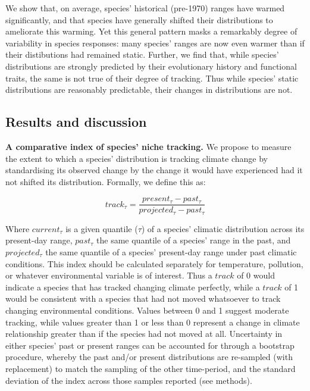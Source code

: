 \documentclass[12pt]{report}
\begin{document}
We show that, on average, species' historical (pre-1970) ranges have
warmed significantly, and that species have generally shifted their
distributions to ameliorate this warming. Yet this general pattern
masks a remarkably degree of variability in species responses: many
species' ranges are now even warmer than if their distibutions had
remained static. Further, we find that, while species' distributions
are strongly predicted by their evolutionary history and functional
traits, the same is not true of their degree of tracking. Thus while
species' static distributions are reasonably predictable, their
changes in distributions are not.

\clearpage
\subsection*{Results and discussion}
\textbf{A comparative index of species' niche tracking.} We propose to
measure the extent to which a species' distribution is tracking
climate change by standardising its observed change by the change it
would have experienced had it not shifted its distribution. Formally,
we define this as:

\begin{equation}
  track_\tau = \frac{present_\tau - past_\tau}{projected_\tau - past_\tau}
\end{equation}

Where $current_\tau$ is a given quantile ($\tau$) of a species'
climatic distribution across its present-day range, $past_\tau$ the
same quantile of a species' range in the past, and $projected_\tau$
the same quantile of a species' present-day range under past climatic
conditions. This index should be calculated separately for
temperature, pollution, or whatever environmental variable is of
interest. Thus a $track$ of 0 would indicate a species that has
tracked changing climate perfectly, while a $track$ of 1 would be
consistent with a species that had not moved whatsoever to track
changing environmental conditions. Values between 0 and 1 suggest
moderate tracking, while values greater than 1 or less than 0
represent a change in climate relationship greater than if the species
had not moved at all. Uncertainty in either species' past or present
ranges can be accounted for through a bootstrap procedure, whereby the
past and/or present distributions are re-sampled (with replacement) to
match the sampling of the other time-period, and the standard
deviation of the index across those samples reported (see methods).
\end{document}
